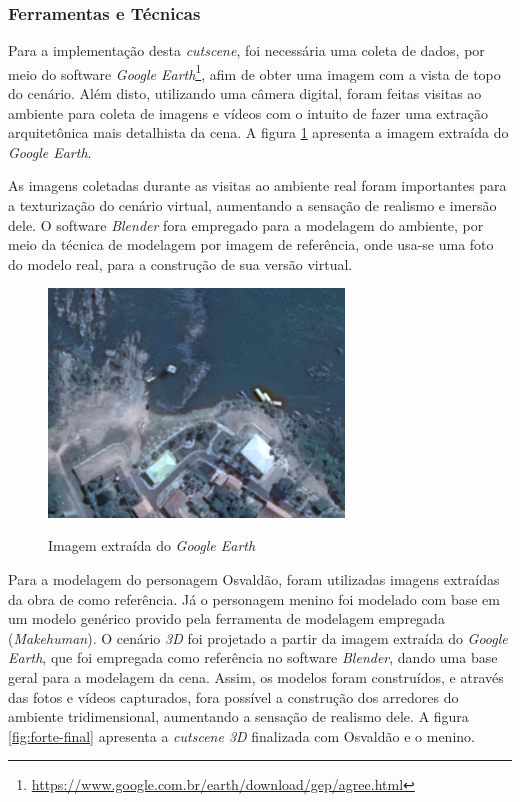\subsubsection{Ferramentas e Técnicas}

Para a implementação desta \textit{cutscene}, foi necessária uma coleta de dados, por meio do software \textit{Google Earth}\footnote{\url{https://www.google.com.br/earth/download/gep/agree.html}}, afim de obter uma imagem com a vista de topo do cenário. Além disto, utilizando uma câmera digital, foram feitas visitas ao ambiente para coleta de imagens e vídeos com o intuito de fazer uma extração arquitetônica mais detalhista da cena. A figura \ref{fig:forte-planta} apresenta a imagem extraída do \textit{Google Earth}.

As imagens coletadas durante as visitas ao ambiente real foram importantes para a texturização do cenário virtual, aumentando a sensação de realismo e imersão dele. O software \textit{Blender} fora empregado para a modelagem do ambiente, por meio da técnica de modelagem por imagem de referência, onde usa-se uma foto do modelo real, para a construção de sua versão virtual.

\begin{figure}[H]
	\centering
	\caption{Imagem extraída do \textit{Google Earth}}
	\includegraphics[width=0.7\textwidth]{figuras/forte_planta.png}
	\label{fig:forte-planta}
	{}
\end{figure}

Para a modelagem do personagem Osvaldão, foram utilizadas imagens extraídas da obra de  como referência. Já o personagem menino foi modelado com base em um modelo genérico provido pela ferramenta de modelagem empregada (\textit{Makehuman}). O cenário \textit{3D} foi projetado a partir da imagem extraída do \textit{Google Earth}, que foi empregada como referência no software \textit{Blender}, dando uma base geral para a modelagem da cena. Assim, os modelos foram construídos, e através das fotos e vídeos capturados, fora possível a construção dos arredores do ambiente tridimensional, aumentando a sensação de realismo dele. A figura \ref{fig:forte-final} apresenta a \textit{cutscene 3D} finalizada com Osvaldão e o menino.

